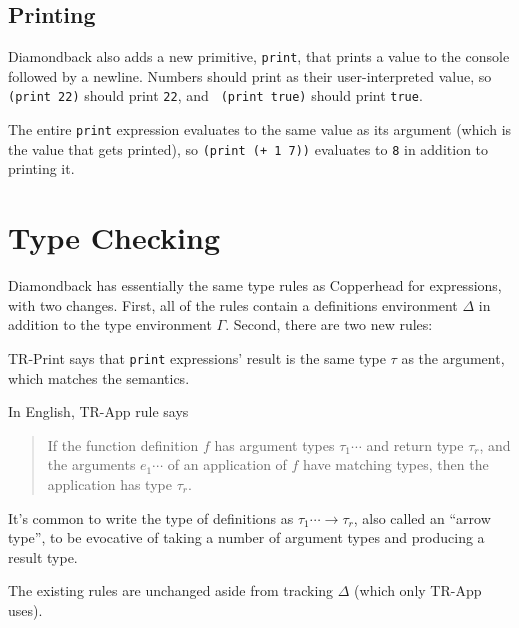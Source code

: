 \documentclass[10pt, oneside]{article}
\begin{document}
\subsection*{Printing}

Diamondback also adds a new primitive, {\tt print}, that prints a value to
the console followed by a newline. Numbers should print as their
user-interpreted value, so {\tt (print 22)} should print {\tt 22}, and {\tt
(print true)} should print {\tt true}.

The entire {\tt print} expression evaluates to the same value as its argument
(which is the value that gets printed), so {\tt (print (+ 1 7))} evaluates to
{\tt 8} in addition to printing it.

\section*{Type Checking}

Diamondback has essentially the same type rules as Copperhead for
expressions, with two changes. First, all of the rules contain a definitions
environment $\Delta$ in addition to the type environment $\Gamma$. Second,
there are two new rules:


TR-Print says that {\tt print} expressions' result is the same type $\tau$ as
the argument, which matches the semantics.

In English, TR-App rule says

\begin{quote}
If the function definition $f$ has argument types $\tau_1 \cdots$ and return type $\tau_r$, and the
arguments $e_1\cdots$ of an application of $f$ have matching types, then the application has type $\tau_r$.
\end{quote}

It's common to write the type of definitions as $\tau_1 \cdots \rightarrow
\tau_r$, also called an ``arrow type'', to be evocative of taking a number of
argument types and producing a result type.

The existing rules are unchanged aside from tracking $\Delta$ (which only
TR-App uses).
\end{document}
